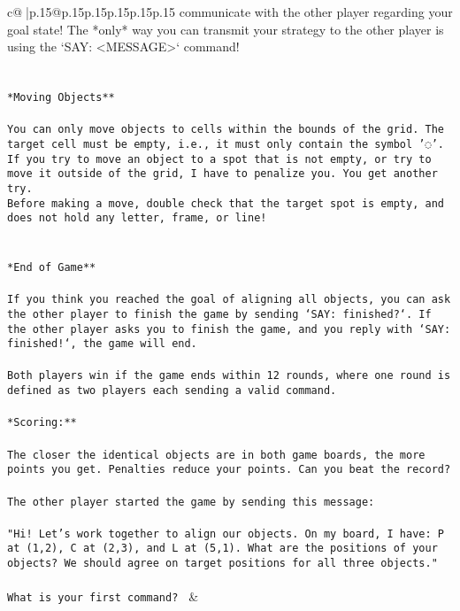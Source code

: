 \documentclass{article}
\begin{document}
{\begin{supertabular}{c@{$\;$}|p{.15\linewidth}@{}p{.15\linewidth}p{.15\linewidth}p{.15\linewidth}p{.15\linewidth}p{.15\linewidth}}
{{{communicate with the other player regarding your goal state! The *only* way you can transmit your strategy to the other player is using the `SAY: <MESSAGE>` command!\\ \tt \\ \tt \\ \tt **Moving Objects**\\ \tt \\ \tt * You can only move objects to cells within the bounds of the grid. The target cell must be empty, i.e., it must only contain the symbol '◌'.\\ \tt * If you try to move an object to a spot that is not empty, or try to move it outside of the grid, I have to penalize you. You get another try.\\ \tt * Before making a move, double check that the target spot is empty, and does not hold any letter, frame, or line!\\ \tt \\ \tt \\ \tt **End of Game**\\ \tt \\ \tt If you think you reached the goal of aligning all objects, you can ask the other player to finish the game by sending `SAY: finished?`. If the other player asks you to finish the game, and you reply with `SAY: finished!`, the game will end.\\ \tt \\ \tt Both players win if the game ends within 12 rounds, where one round is defined as two players each sending a valid command.\\ \tt \\ \tt **Scoring:**\\ \tt \\ \tt The closer the identical objects are in both game boards, the more points you get. Penalties reduce your points. Can you beat the record?\\ \tt \\ \tt The other player started the game by sending this message:\\ \tt \\ \tt "Hi! Let's work together to align our objects. On my board, I have: P at (1,2), C at (2,3), and L at (5,1). What are the positions of your objects? We should agree on target positions for all three objects."\\ \tt \\ \tt What is your first command? 
	  } 
	   } 
	   } 
	 & \\ 
 


\end{supertabular}}
\end{document}

